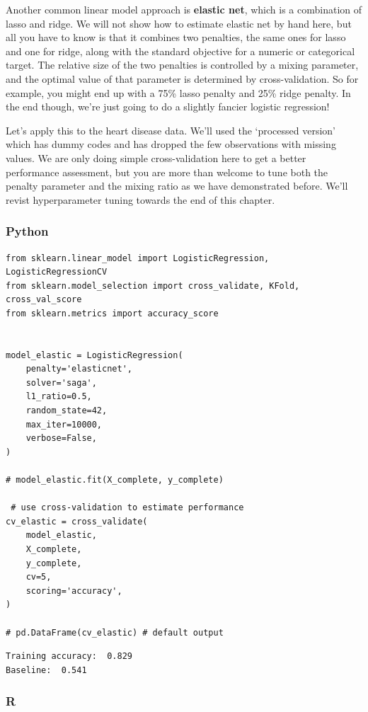 \documentclass[
  letterpaper,
]{krantz}
\begin{document}
Another common linear model approach is \textbf{elastic net}, which is a
combination of lasso and ridge. We will not show how to estimate elastic
net by hand here, but all you have to know is that it combines two
penalties, the same ones for lasso and one for ridge, along with the
standard objective for a numeric or categorical target. The relative
size of the two penalties is controlled by a mixing parameter, and the
optimal value of that parameter is determined by cross-validation. So
for example, you might end up with a 75\% lasso penalty and 25\% ridge
penalty. In the end though, we're just going to do a slightly fancier
logistic regression!

Let's apply this to the heart disease data. We'll used the `processed
version' which has dummy codes and has dropped the few observations with
missing values. We are only doing simple cross-validation here to get a
better performance assessment, but you are more than welcome to tune
both the penalty parameter and the mixing ratio as we have demonstrated
before. We'll revist hyperparameter tuning towards the end of this
chapter.

\subsubsection{Python}

\begin{verbatim}
from sklearn.linear_model import LogisticRegression, LogisticRegressionCV
from sklearn.model_selection import cross_validate, KFold, cross_val_score
from sklearn.metrics import accuracy_score


model_elastic = LogisticRegression(
    penalty='elasticnet',
    solver='saga',
    l1_ratio=0.5,
    random_state=42,
    max_iter=10000,
    verbose=False,
)

# model_elastic.fit(X_complete, y_complete)

 # use cross-validation to estimate performance
cv_elastic = cross_validate(
    model_elastic,
    X_complete,
    y_complete,
    cv=5,
    scoring='accuracy',
)

# pd.DataFrame(cv_elastic) # default output
\end{verbatim}

\begin{verbatim}
Training accuracy:  0.829 
Baseline:  0.541
\end{verbatim}

\subsubsection{R}
\end{document}
